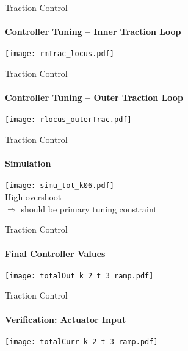 \begin{frame}{Traction Control}
\framesubtitle{Controller Tuning -- Inner Traction Loop}
\texttt{[image: rmTrac\_locus.pdf]}
\end{frame}

\begin{frame}{Traction Control}
\framesubtitle{Controller Tuning -- Outer Traction Loop}
\texttt{[image: rlocus\_outerTrac.pdf]}
\end{frame}

\begin{frame}{Traction Control}
\framesubtitle{Simulation}
\texttt{[image: simu\_tot\_k06.pdf]}\\
High overshoot\\$\Rightarrow$ should be primary tuning constraint
\end{frame}

\begin{frame}{Traction Control}
\framesubtitle{Final Controller Values}
\texttt{[image: totalOut\_k\_2\_t\_3\_ramp.pdf]}
\end{frame}

\begin{frame}{Traction Control}
\framesubtitle{Verification: Actuator Input}
\centering
\texttt{[image: totalCurr\_k\_2\_t\_3\_ramp.pdf]}
\end{frame}
